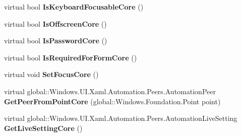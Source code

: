 \begin{DoxyCompactItemize}
virtual bool {\bfseries Is\+Keyboard\+Focusable\+Core} ()
\item 
\mbox{\label{class_windows_1_1_u_i_1_1_xaml_1_1_automation_1_1_peers_1_1_automation_peer_a700600507d8f0766a1f153ae80c23a1c}} 
virtual bool {\bfseries Is\+Offscreen\+Core} ()
\item 
\mbox{\label{class_windows_1_1_u_i_1_1_xaml_1_1_automation_1_1_peers_1_1_automation_peer_a28c53d7ba3793aef88acb71b50c0f7c1}} 
virtual bool {\bfseries Is\+Password\+Core} ()
\item 
\mbox{\label{class_windows_1_1_u_i_1_1_xaml_1_1_automation_1_1_peers_1_1_automation_peer_a0936e74a3f6ad1b97d4432d0e591f140}} 
virtual bool {\bfseries Is\+Required\+For\+Form\+Core} ()
\item 
\mbox{\label{class_windows_1_1_u_i_1_1_xaml_1_1_automation_1_1_peers_1_1_automation_peer_aa7889a5f57de469eafa2b358f03ce530}} 
virtual void {\bfseries Set\+Focus\+Core} ()
\item 
\mbox{\label{class_windows_1_1_u_i_1_1_xaml_1_1_automation_1_1_peers_1_1_automation_peer_af1a638c64d6aba46c623ea842fc206ac}} 
virtual global\+::\+Windows.\+U\+I.\+Xaml.\+Automation.\+Peers.\+Automation\+Peer {\bfseries Get\+Peer\+From\+Point\+Core} (global\+::\+Windows.\+Foundation.\+Point point)
\item 
\mbox{\label{class_windows_1_1_u_i_1_1_xaml_1_1_automation_1_1_peers_1_1_automation_peer_a237b9e6ecc2fb3779ea808e8460aaa07}} 
virtual global\+::\+Windows.\+U\+I.\+Xaml.\+Automation.\+Peers.\+Automation\+Live\+Setting {\bfseries Get\+Live\+Setting\+Core} ()
\item 
\mbox{\label{class_windows_1_1_u_i_1_1_xaml_1_1_automation_1_1_peers_1_1_automation_peer_afb1e787b7ca36dd06affdaa830a30a27}} 

\end{DoxyCompactItemize}
